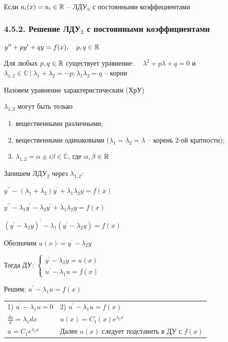 \documentclass[12pt]{article}
\begin{document}
    \Notas Если $a_i(x) = a_i \in \mathbb{R}$ -- ЛДУ$_n$ с постоянными коэффициентами

    \hypertarget{lineardifferentialequationseconddegreewithconstants}{}

    \subsubsection{4.5.2. Решение ЛДУ$_2$ с постоянными коэффициентами}

    $y^{\prime\prime} + p y^\prime + q y = f(x), \quad p, q \in \mathbb{R}$

    Для любых $p, q \in \mathbb{R}$ существует уравнение: $\quad \lambda^2 + p\lambda + q = 0$ и $\lambda_{1,2} \in \mathbb{C} \ | \ \lambda_1 + \lambda_2 = -p, \lambda_1 \lambda_2 = q$ -- корни

    Назовем уравнение характеристическим (ХрУ) \Cat

    \Nota $\lambda_{1, 2}$ могут быть только

    \begin{enumerate}
        \item вещественными различными;

        \item вещественными одинаковыми ($\lambda_1 = \lambda_2 = \lambda$ -- корень 2-ой кратности);

        \item $\lambda_{1,2} = \alpha \pm i \beta \in \mathbb{C}$, где $\alpha, \beta \in \mathbb{R}$
    \end{enumerate}

    Запишем ЛДУ$_2$ через $\lambda_{1, 2}$:

    $y^{\prime\prime} - (\lambda_1 + \lambda_2) y^\prime + \lambda_1 \lambda_2 y = f(x)$

    $y^{\prime\prime} - \lambda_1 y^\prime - \lambda_2 y^\prime + \lambda_1 \lambda_2 y = f(x)$

    $(y^\prime - \lambda_2 y)^\prime - \lambda_1 (y^\prime - \lambda_2 y) = f(x)$

    Обозначим $u(x) = y^\prime - \lambda_2 y$

    Тогда ДУ: $\begin{cases}
                   y^\prime - \lambda_2 y = u(x) \\ u^\prime - \lambda_1 u = f(x)
    \end{cases}$

    Решим: $u^\prime - \lambda_1 u = f(x)$

    \begin{tabular}{p{5cm}p{10cm}}
        1) $u^\prime - \lambda_1 u = 0$      & 2) $u^\prime - \lambda_1 u = f(x)$            \\

        $\frac{du}{u} = \lambda_1 dx$        & $u(x) = C_1(x)e^{\lambda_1 x}$                \\

        $\overline{u} = C_1 e^{\lambda_1 x}$ & Далее $u(x)$ следует подставить в ДУ с $f(x)$ \\
    \end{tabular}
\end{document}
